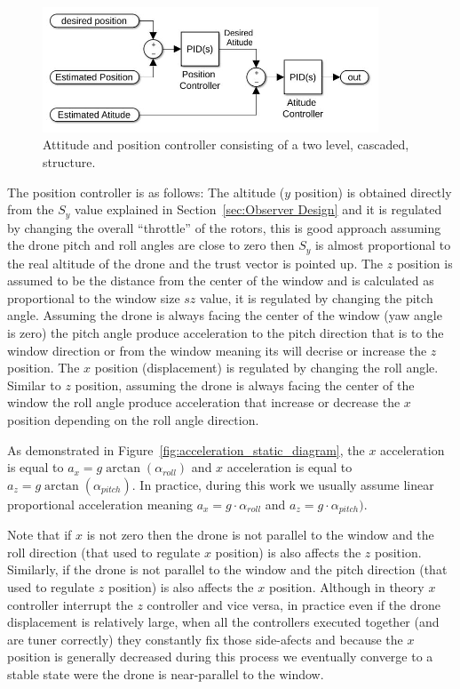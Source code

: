 \documentclass[ twoside, 12pt ]{article}
\begin{document}
\begin{figure} %
    \centerline{\includegraphics[width=100mm]{two_level_controller.jpg}}
    \caption{Attitude and position controller consisting of a two level, cascaded, structure.}
    \label{fig:controllerStracture}
\end{figure}

The position controller is as follows:
The altitude ($y$ position) is obtained directly from the $S_y$ value explained in Section~\ref{sec:Observer Design} and it is regulated by changing the overall ``throttle'' of the rotors, this is good approach assuming the drone pitch and roll angles are close to zero then $S_y$ is almost proportional to the real altitude of the drone and the trust vector is pointed up.
The $z$ position is assumed to be the distance from the center of the window and is calculated as proportional to the window size $sz$ value, it is regulated by changing the pitch angle. Assuming the drone is always facing the center of the window (yaw angle is zero) the pitch angle produce acceleration to the pitch direction that is to the window direction or from the window meaning its will decrise or increase the $z$ position.
The $x$ position (displacement) is regulated by changing the roll angle. Similar to $z$ position, assuming the drone is always facing the center of the window the roll angle produce acceleration that increase or decrease the $x$ position depending on the roll angle direction.

As demonstrated in Figure~\ref{fig:acceleration_static_diagram}, the $x$ acceleration is equal to $a_x=g \arctan(\alpha_{roll})$ and $x$ acceleration is equal to $a_z=g \arctan(\alpha_{pitch})$. 
In practice, during this work we usually assume linear proportional acceleration meaning $a_x=g \cdot \alpha_{roll}$ and $a_z=g \cdot \alpha_{pitch})$.

Note that if $x$ is not zero then the drone is not parallel to the window and the roll direction (that used to regulate $x$ position) is also affects the $z$ position.
Similarly, if the drone is not parallel to the window and the pitch direction (that used to regulate $z$ position) is also affects the $x$ position.
Although in theory $x$ controller interrupt the $z$ controller and vice versa, in practice even if the drone displacement is relatively large, when all the controllers executed together (and are tuner correctly) they constantly fix those side-afects and because the $x$ position is generally decreased during this process we eventually converge to a stable state were the drone is near-parallel to the window.
\end{document}

